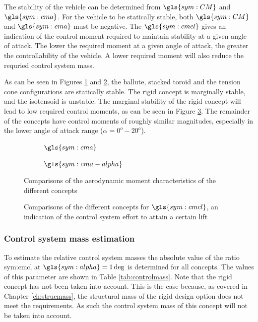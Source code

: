 The stability of the vehicle can be determined from $\gls{sym:CM}$ and $\gls{sym:cma}$. For the vehicle to be statically stable, both $\gls{sym:CM}$ and $\gls{sym:cma}$ must be negative. The $\gls{sym:cmcl}$ gives an indication of the control moment required to maintain stability at a given angle of attack. The lower the required moment at a given angle of attack, the greater the controllability of the vehicle. A lower required moment will also reduce the requried control system mass. 
 
As can be seen in Figures \ref{fig:cm} and \ref{fig:cmalpha}, the ballute, stacked toroid and the tension cone configurations are statically stable. The rigid concept is marginally stable, and the isotensoid is unstable. The marginal stability of the rigid concept will lead to low required control moments, as can be seen in Figure \ref{fig:cmplots}. The remainder of the concepts have control moments of roughly similar magnitudes, especially in the lower angle of attack range ($\alpha = 0^{o}-20^{o}$).  
 
\begin{figure}[h]
	\centering
	\begin{subfigure}[b]{0.49\textwidth}

		\setlength{} 
		\setlength{}
				

		\caption{$\gls{sym:cma}$}
		\label{fig:cm}
	\end{subfigure}
	\begin{subfigure}[b]{0.49\textwidth}

		\setlength{} 
		\setlength{}
				

		\caption{$\gls{sym:cma-alpha}$}
		\label{fig:cmalpha}
	\end{subfigure}
	\caption{Comparisons of the aerodynamic moment characteristics of the different concepts}
	\label{fig:cmplots}
\end{figure}


\begin{figure}[h]
	\centering
	\setlength{} 
	\setlength{}
		
	\caption{Comparisons of the different concepts for $\gls{sym:cmcl}$, an indication of the control system effort to attain a certain lift}
	\label{fig:cmcl}
\end{figure}

\subsubsection{Control system mass estimation}
To estimate the relative control system masses the absolute value of the ratio \gls{sym:cmcl} at $\gls{sym:alpha}=1\deg$ is determined for all concepts. The values of this parameter are shown in Table \ref{tab:controlmass}. Note that the rigid concept has not been taken into account. This is the case because, as covered in Chapter \ref{ch:strucmass}, the structural mass of the rigid design option does not meet the requirements. As such the control system mass of this concept will not be taken into account. 

